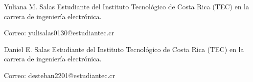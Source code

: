 \documentclass[journal]{IEEEtran}
\begin{document}
\begin{IEEEbiographynophoto}{Yuliana M. Salas}
        Estudiante del Instituto Tecnológico de Costa Rica (TEC) en la carrera de ingeniería electrónica.
        
        Correo: yulisalas0130@estudiantec.cr
\end{IEEEbiographynophoto}

\begin{IEEEbiographynophoto}{Daniel E. Salas}
        Estudiante del Instituto Tecnológico de Costa Rica (TEC) en la carrera de ingeniería electrónica.
        
        Correo: desteban2201@estudiantec.cr
\end{IEEEbiographynophoto}

\vfill
\end{document}
